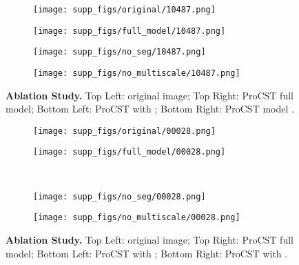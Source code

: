 \documentclass[letterpaper]{article} \usepackage[]{aaai23}  \usepackage{times}  \usepackage{helvet}  \usepackage{courier}  \usepackage[hyphens]{url}  \usepackage{graphicx} \urlstyle{rm} \def\UrlFont{\rm}  \usepackage{natbib}  \usepackage{caption} \frenchspacing  \setlength{\pdfpagewidth}{8.5in} \setlength{\pdfpageheight}{11in} \usepackage{algorithm}
\begin{document}
\begin{figure*}
    \begin{subfigure}{0.5\linewidth}
        \centering
        \texttt{[image: supp\_figs/original/10487.png]}
    \end{subfigure}
    \begin{subfigure}{0.5\linewidth}
        \centering
        \texttt{[image: supp\_figs/full\_model/10487.png]}
    \end{subfigure}
        \begin{subfigure}{0.5\linewidth}
        \centering
        \texttt{[image: supp\_figs/no\_seg/10487.png]}
    \end{subfigure}
    \begin{subfigure}{0.5\linewidth}
        \centering
        \texttt{[image: supp\_figs/no\_multiscale/10487.png]}
    \end{subfigure}
    \caption{\textbf{Ablation Study.} Top Left: original image; Top Right: ProCST full model; Bottom Left: ProCST with ; Bottom Right: ProCST model .}
    \label{ablations_compare_1}
\end{figure*}
\begin{figure*}
    \begin{subfigure}{0.5\linewidth}
        \centering
        \texttt{[image: supp\_figs/original/00028.png]}
    \end{subfigure}
    \begin{subfigure}{0.5\linewidth}
        \centering
        \texttt{[image: supp\_figs/full\_model/00028.png]}
    \end{subfigure}\\
\begin{subfigure}{0.5\linewidth}
        \centering
        \texttt{[image: supp\_figs/no\_seg/00028.png]}
    \end{subfigure}
    \begin{subfigure}{0.5\linewidth}
        \centering
        \texttt{[image: supp\_figs/no\_multiscale/00028.png]}
    \end{subfigure}
    \caption{\textbf{Ablation Study.} Top Left: original image; Top Right: ProCST full model; Bottom Left: ProCST with ; Bottom Right: ProCST with .}
    \label{ablations_compare_2}
\end{figure*}
\end{document}
